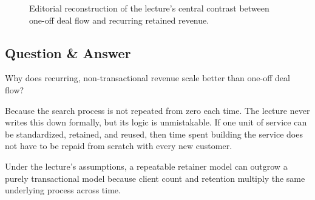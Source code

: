 \begin{figure}[h]
\centering
{}
\caption{Editorial reconstruction of the lecture's central contrast between one-off deal flow and recurring retained revenue.}
\end{figure}

\subsection{Question \& Answer}

Why does recurring, non-transactional revenue scale better than one-off deal flow?

Because the search process is not repeated from zero each time. The lecture never writes this down formally, but its logic is unmistakable. If one unit of service can be standardized, retained, and reused, then time spent building the service does not have to be repaid from scratch with every new customer.

\begin{proposition}
Under the lecture's assumptions, a repeatable retainer model can outgrow a purely transactional model because client count and retention multiply the same underlying process across time.
\end{proposition}


